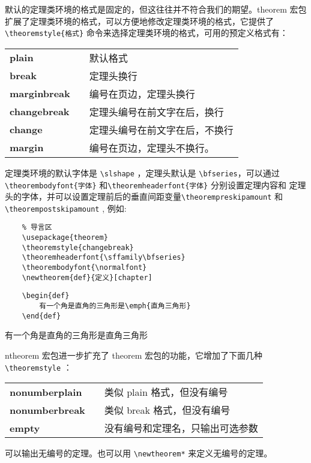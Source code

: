 默认的定理类环境的格式是固定的，但这往往并不符合我们的期望。theorem 宏包扩展了定理类环境的格式，可以方便地修改定理类环境的格式，它提供了 
\verb|\theoremstyle{格式}| 命令来选择定理类环境的格式，可用的预定义格式有：

\begin{table}[H]
    \centering
    \begin{tabular}{lll}
        \ttfamily\bfseries plain && 默认格式 \\ 
        \ttfamily\bfseries  break && 定理头换行 \\
        \ttfamily\bfseries marginbreak && 编号在页边，定理头换行 \\ 
        \ttfamily\bfseries changebreak && 定理头编号在前文字在后，换行 \\ 
        \ttfamily\bfseries change && 定理头编号在前文字在后，不换行 \\ 
        \ttfamily\bfseries margin && 编号在页边，定理头不换行。
    \end{tabular}
\end{table}

定理类环境的默认字体是 \verb|\slshape| ，定理头默认是 \verb|\bfseries|，可以通过
\verb|\theorembodyfont{字体}| 和\verb|\theoremheaderfont{字体}| 分别设置定理内容和
定理头的字体，并可以设置定理前后的垂直间距变量\verb|\theorempreskipamount| 和
\verb|\theorempostskipamount| , 例如:

\begin{lstlisting}
    % 导言区
    \usepackage{theorem}
    \theoremstyle{changebreak}
    \theoremheaderfont{\sffamily\bfseries}
    \theorembodyfont{\normalfont}
    \newtheorem{def}{定义}[chapter]
\end{lstlisting}



\begin{minipage}[t]{0.45\textwidth}
\begin{lstlisting}
    \begin{def}
        有一个角是直角的三角形是\emph{直角三角形}
    \end{def}
\end{lstlisting}
\end{minipage}
\hfill
\begin{minipage}[t]{0.45\textwidth}
    \begin{Def}
        有一个角是直角的三角形是{直角三角形}
    \end{Def}
\end{minipage}

ntheorem 宏包进一步扩充了 theorem 宏包的功能，它增加了下面几种 \verb|\theoremstyle| ：
\begin{table}[H]
    \centering
    \begin{tabular}{lll}
        \ttfamily\bfseries nonumberplain && 类似 {\ttfamily plain} 格式，但没有编号 \\ 
        \ttfamily\bfseries  nonumberbreak && 类似 {\ttfamily break} 格式，但没有编号 \\
        \ttfamily\bfseries empty && 没有编号和定理名，只输出可选参数
    \end{tabular}
\end{table}
可以输出无编号的定理。也可以用 \verb|\newtheorem*| 来定义无编号的定理。

